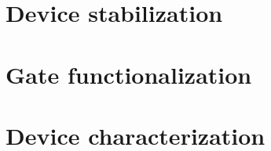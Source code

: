 %


\section{Device stabilization}
\label{sec:membrane_stabilization}

%


\section{Gate functionalization} 
\label{sec:functionalization}

%


\section{Device characterization}
\label{sec:characterization}

%


\newpage
\thispagestyle{empty}
\ %
\newpage
